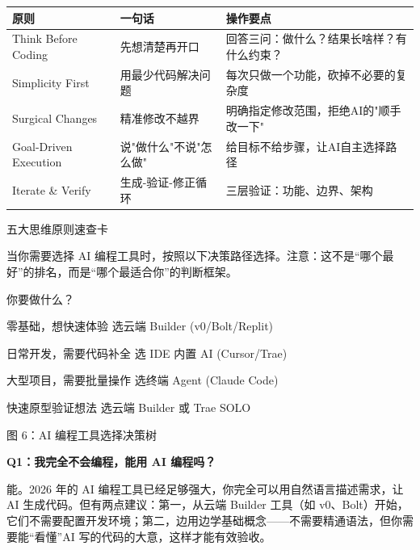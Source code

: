 


\begin{center}
\begin{tabularx}{\linewidth}{|X|X|X|}
\hline
\textbf{原则} & \textbf{一句话} & \textbf{操作要点} \tabularnewline
\hline
Think Before Coding & 先想清楚再开口 & 回答三问：做什么？结果长啥样？有什么约束？ \tabularnewline
Simplicity First & 用最少代码解决问题 & 每次只做一个功能，砍掉不必要的复杂度 \tabularnewline
Surgical Changes & 精准修改不越界 & 明确指定修改范围，拒绝AI的"顺手改一下" \tabularnewline
Goal-Driven Execution & 说"做什么"不说"怎么做" & 给目标不给步骤，让AI自主选择路径 \tabularnewline
Iterate \& Verify & 生成-验证-修正循环 & 三层验证：功能、边界、架构 \tabularnewline
\hline
\end{tabularx}
\end{center}

\begin{center}\small\color{gray}五大思维原则速查卡\end{center}


当你需要选择 AI 编程工具时，按照以下决策路径选择。注意：这不是“哪个最好”的排名，而是“哪个最适合你”的判断框架。

你要做什么？

零基础，想快速体验 选云端 Builder (v0/Bolt/Replit)

日常开发，需要代码补全 选 IDE 内置 AI (Cursor/Trae)

大型项目，需要批量操作 选终端 Agent (Claude Code)

快速原型验证想法 选云端 Builder 或 Trae SOLO

\begin{center}\small\color{gray}图 6：AI 编程工具选择决策树\end{center}


\textbf{Q1：我完全不会编程，能用 AI 编程吗？}

能。2026 年的 AI 编程工具已经足够强大，你完全可以用自然语言描述需求，让 AI 生成代码。但有两点建议：第一，从云端 Builder 工具（如 v0、Bolt）开始，它们不需要配置开发环境；第二，边用边学基础概念——不需要精通语法，但你需要能“看懂”AI 写的代码的大意，这样才能有效验收。


